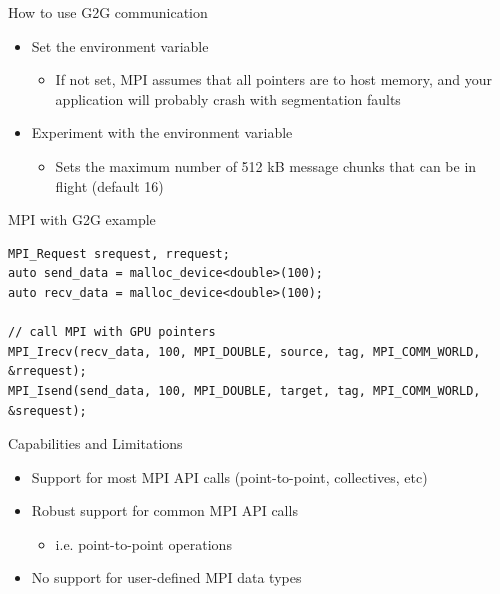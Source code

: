 \documentclass[aspectratio=43]{beamer}
\begin{document}
\begin{frame}[fragile]{How to use G2G communication}
    \begin{itemize}
        \item Set the environment variable 
        \begin{itemize}
            \item If not set, MPI assumes that all pointers are to host memory, and your application will probably crash with segmentation faults
        \end{itemize}
        \item Experiment with the environment variable 
        \begin{itemize}
            \item Sets the maximum number of 512 kB message chunks that can be in flight (default 16)
        \end{itemize}
    \end{itemize}

   \begin{code}{MPI with G2G example}
        \begin{lstlisting}[style=boxcudatiny]
MPI_Request srequest, rrequest;
auto send_data = malloc_device<double>(100);
auto recv_data = malloc_device<double>(100);

// call MPI with GPU pointers
MPI_Irecv(recv_data, 100, MPI_DOUBLE, source, tag, MPI_COMM_WORLD, &rrequest);
MPI_Isend(send_data, 100, MPI_DOUBLE, target, tag, MPI_COMM_WORLD, &srequest);
        \end{lstlisting}
   \end{code}

\end{frame}

\begin{frame}[fragile]{Capabilities and Limitations}
    \begin{itemize}
        \item Support for most MPI API calls (point-to-point, collectives, etc)
        \item Robust support for common MPI API calls
        \begin{itemize}
            \item i.e. point-to-point operations 
        \end{itemize}
        \item No support for user-defined MPI data types
    \end{itemize}
\end{frame}
\end{document}
